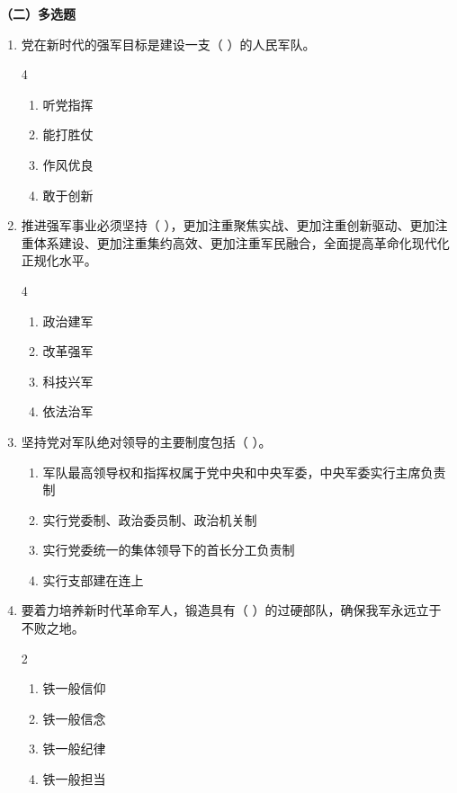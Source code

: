 \documentclass[a4paper,11pt]{ctexart}
\begin{document}
\textbf{（二）多选题}
\begin{enumerate}
    \item 党在新时代的强军目标是建设一支（ ）的人民军队。
    \begin{multicols}{4}
    \begin{enumerate}
        \item 听党指挥
        \item 能打胜仗
        \item 作风优良
        \item 敢于创新
    \end{enumerate}
    \end{multicols}

    \item 推进强军事业必须坚持（ ），更加注重聚焦实战、更加注重创新驱动、更加注重体系建设、更加注重集约高效、更加注重军民融合，全面提高革命化现代化正规化水平。
    \begin{multicols}{4}
    \begin{enumerate}
        \item 政治建军
        \item 改革强军
        \item 科技兴军
        \item 依法治军
    \end{enumerate}
    \end{multicols}

    \item 坚持党对军队绝对领导的主要制度包括（ ）。
    \begin{enumerate}
        \item 军队最高领导权和指挥权属于党中央和中央军委，中央军委实行主席负责制
        \item 实行党委制、政治委员制、政治机关制
        \item 实行党委统一的集体领导下的首长分工负责制
        \item 实行支部建在连上
    \end{enumerate}

    \item 要着力培养新时代革命军人，锻造具有（ ）的过硬部队，确保我军永远立于不败之地。
    \begin{multicols}{2}
    \begin{enumerate}
        \item 铁一般信仰
        \item 铁一般信念
        \item 铁一般纪律
        \item 铁一般担当
    \end{enumerate}
    \end{multicols}


\end{enumerate}
\end{document}
